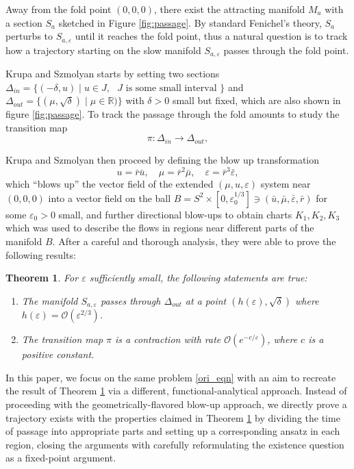 \documentclass[letterpaper,11pt]{article}
\newcommand{\rmO}{\mathcal{O}}
\newcommand{\eps}{\varepsilon}
\numberwithin{equation}{section}
\theoremstyle{plain}
\newtheorem{theorem}{Theorem}[section]
\begin{document}
 Away from the fold point $(0,0,0)$, there exist the attracting manifold $M_a$ with a section $S_a$ sketched in Figure \ref{fig:passage}. By standard Fenichel's theory, $S_a$ perturbs to $S_{a,\eps}$ until it reaches the fold point, thus a natural question is to track how a trajectory starting on the slow manifold $S_{a,\eps}$ passes through the fold point.

Krupa and Szmolyan starts by setting two sections $\Delta_{in} = \{(-\delta, u) \mid u\in J,\text{ $J$ is some small interval }\}$ and $\Delta_{out} = \{( \mu ,\sqrt{\delta})\mid \mu \in \mathbb{R})\}$ with $\delta>0$ small but fixed, which are also shown in figure \ref{fig:passage}. To track the passage through the fold amounts to study the transition map 
\[
\pi: \Delta_{in} \to \Delta_{out},
\]

Krupa and Szmolyan then proceed by defining the blow up transformation
\[
u =\bar{r} \bar{u},  \quad \mu = \bar{r}^2 \bar{\mu}, \quad  \eps = \bar{r}^3 \bar{\eps},
\]
which ``blows up'' the vector field of the extended $(\mu, u, \eps)$ system near $(0,0,0)$ into a vector field on the ball $B = S^2 \times [0,\eps_0^{1/3}] \ni (\bar{u}, \bar{\mu}, \bar{\eps}, \bar{r})$ for some $\eps_0>0$ small, and further directional blow-ups to obtain charts $K_1,K_2,K_3$ which was used to describe the flows in regions near different parts of the manifold $B$. After a careful and thorough analysis, they were able to prove the following results:
\begin{theorem}\label{ks_main}
For $\eps$ sufficiently small, the following statements are true:
\begin{enumerate}
\item The manifold $S_{a,\eps} $ passes through  $\Delta_{out}$ at a point $(h(\eps), \sqrt{\delta})$ where $h(\eps) = \rmO(\eps^{2/3})$.
\item The transition map $\pi$ is a contraction with rate $\rmO(e^{-c/\eps} )$, where $c$ is a positive constant.
\end{enumerate}
\end{theorem}


In this paper, we focus on the same problem \eqref{ori_eqn} with an aim to recreate the result of Theorem \ref{ks_main} via a different, functional-analytical approach. Instead of proceeding with the geometrically-flavored blow-up approach, we directly prove a trajectory exists with the properties claimed in Theorem \ref{ks_main} by dividing the time of passage into appropriate parts and setting up a corresponding ansatz in each region, closing the arguments with carefully reformulating the existence question as a fixed-point argument.
\end{document}
